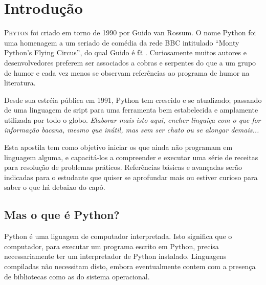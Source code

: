 \documentclass[
	12pt,				%
	openright,			%
	twoside,			%
	a4paper,			%
	english,			%
	french,				%
	brazil,				%
	sumario=tradicional
]{abntex2}
\renewcommand{\textual}{%
  \pagestyle{abntbookheadings}%
  \aliaspagestyle{chapter}{abntbookchapfirst}%
  \nouppercaseheads%
  \bookmarksetup{startatroot}%
}
\begin{document}
\listoffigures*
\cleardoublepage

\listoftables*
\cleardoublepage

\tableofcontents*
\cleardoublepage

\mainmatter
\OnehalfSpacing
\chapter*[Introdução]{Introdução} %

\lettrine[nindent=0.35em,lhang=0.40,loversize=0.3]{P}{hyton} foi criado em torno de 1990 por
 Guido van Rossum.
O nome Python foi uma homenagem a um seriado de comédia da rede BBC intitulado
 ``Monty Python's Flying Circus'', do qual Guido é fã \cite{Lutz}. 
 Curiosamente muitos autores e desenvolvedores preferem ser associados a cobras e serpentes 
 do que a um grupo de humor e cada vez menos se observam referências ao programa de humor na literatura.

Desde sua estréia pública em 1991, Python tem crescido e se atualizado;
 passando de uma linguagem de sript para uma ferramenta bem estabelecida e 
 amplamente utilizada por todo o globo. 
 \emph{Elaborar mais isto aqui, encher linguiça com o que for informação bacana, 
 mesmo que inútil, mas sem ser chato ou se alongar demais...}

Esta apostila tem como objetivo iniciar os que ainda não programam em linguagem alguma,
e capacitá-los a compreender e executar uma série de receitas para resolução de problemas práticos.
Referências básicas e avançadas serão indicadas para o estudante que quiser se aprofundar mais
ou estiver curioso para saber o que há debaixo do capô.

\section[Mas o que é Python?] {Mas o que é Python?}%
Python é uma liguagem de computador interpretada. 
Isto significa que o computador, para executar um programa escrito em Python,
precisa necessariamente ter um interpretador de Python instalado. 
Linguagens compiladas não necessitam disto, embora eventualmente contem com a presença de 
bibliotecas como as do sistema operacional.
\end{document}
